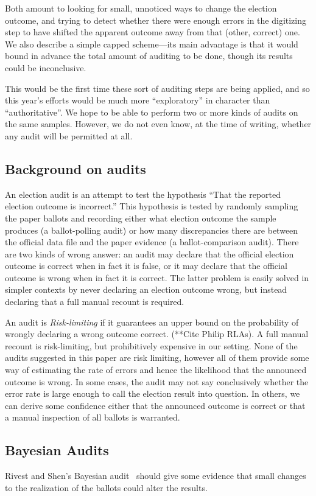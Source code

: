 \documentclass[10pt,a4paper]{article}
\begin{document}
Both amount to looking for small, unnoticed ways to change the election outcome, and trying to detect whether there were enough errors in the digitizing step to have shifted the apparent outcome away from that (other, correct) one. We also describe a simple capped scheme---its main advantage is that it would bound in advance the total amount of auditing to be done, though its results could be inconclusive. 

This would be the first time these sort of auditing steps are
being applied, and so this year's efforts would be much more
``exploratory'' in character than ``authoritative''.  We hope to be able to perform two or more kinds of audits on the same samples.  However, we do not even know, at the time of writing, whether any audit will be permitted at all.  

\subsection{Background on audits}
An election audit is an attempt to test the hypothesis ``That the reported election outcome is incorrect.''  This hypothesis is tested by randomly sampling the paper ballots and recording either what election outcome the sample produces (a ballot-polling audit) or how many discrepancies there are between the official data file and the paper evidence (a ballot-comparison audit). There are two kinds of wrong answer: an audit may declare that the official election outcome is correct when in fact it is false, or it may declare that the official outcome is wrong when in fact it is correct.  The latter problem is easily solved in simpler contexts by never declaring an election outcome wrong, but instead declaring that a full manual recount is required.  

An audit is \emph{Risk-limiting} if it guarantees an upper bound on the probability of wrongly declaring a wrong outcome correct. (**Cite Philip RLAs).  A full manual recount is risk-limiting, but prohibitively expensive in our setting.  None of the audits suggested in this paper are risk limiting, however all of them provide some way of estimating the rate of errors and hence the likelihood that the announced outcome is wrong.  In some cases, the audit may not say conclusively whether the error rate is large enough to call the election result into question.  In others, we can derive some confidence either that the announced outcome is correct or that a manual inspection of all ballots is warranted.

\subsection{Bayesian Audits} Rivest and Shen's Bayesian audit~\cite{rivest2012bayesian} should give some evidence that small changes to the realization of the ballots could alter the results. 
\end{document}

